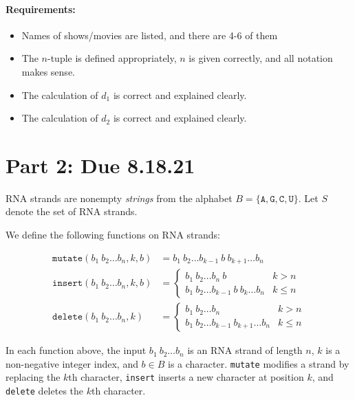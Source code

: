 \documentclass[12pt]{article}
\begin{document}
\paragraph{Requirements:}
\begin{itemize}
  \item Names of shows/movies are listed, and there are 4-6 of them
  \item The $n$-tuple is defined appropriately, $n$ is given correctly, and all
    notation makes sense.
  \item The calculation of $d_1$ is correct and explained clearly.
  \item The calculation of $d_2$ is correct and explained clearly.
\end{itemize}

\section*{Part 2: Due 8.18.21}

RNA strands are nonempty \emph{strings} from the alphabet $B = \{ \texttt{A}, \texttt{G},
\texttt{C}, \texttt{U} \}$.
Let $S$ denote the set of RNA strands.

We define the following functions on RNA strands:

\begin{align*}
  \texttt{mutate}(b_1 \ b_2 \ldots b_n, k, b) &= b_1 \ b_2 \ldots b_{k - 1} \ b \ b_{k + 1} \ldots b_n \\
  \texttt{insert}(b_1 \ b_2 \ldots b_n, k, b) &= 
  \begin{cases}
    b_1 \ b_2 \ldots b_n \ b & k > n \\
    b_1 \ b_2 \ldots b_{k - 1} \ b \ b_k \ldots b_n & k \leq n
  \end{cases} \\
  \texttt{delete}(b_1 \ b_2 \ldots b_n, k) &= 
  \begin{cases}
    b_1 \ b_2 \ldots b_n & k > n \\
    b_1 \ b_2 \ldots b_{k - 1} \ b_{k + 1} \ldots b_n & k \leq n
  \end{cases}
\end{align*}

In each function above, the input $b_1 \ b_2 \ldots b_n$ is an RNA strand of
length $n$, $k$ is a non-negative integer index, and $b \in B$ is a character.
\texttt{mutate}
modifies a strand by replacing the $k$th character, \texttt{insert} inserts a new
character at position $k$, and \texttt{delete} deletes the $k$th character.
\end{document}
